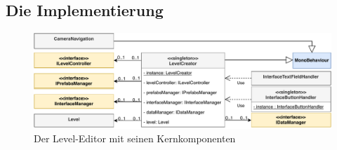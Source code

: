 

\subsection{Die Implementierung}\label{sec:implementation}
\begin {figure}[h]
	\begin {center}
	    \includegraphics[width=1\textwidth]{pics/leveleditor_core.pdf}
		\caption{Der Level-Editor mit seinen Kernkomponenten}
		\label{fig:leveleditor_core}
	\end {center}
\end {figure}

